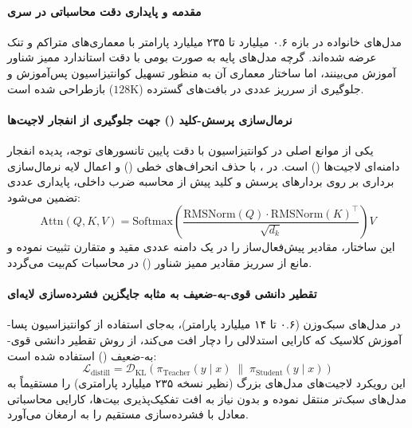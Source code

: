 \item {}

\paragraph*{مقدمه و پایداری دقت محاسباتی در سری }
مدل‌های خانواده  \cite{qwen2025qwen3} در بازه ۰.۶ میلیارد تا ۲۳۵ میلیارد پارامتر با معماری‌های متراکم و تنک عرضه شده‌اند. گرچه مدل‌های پایه به صورت بومی با دقت استاندارد ممیز شناور آموزش می‌بینند، اما ساختار معماری آن به منظور تسهیل کوانتیزاسیون پس‌آموزش و جلوگیری از سرریز عددی در بافت‌های گسترده ($128\text{K}$) بازطراحی شده است.

\paragraph*{نرمال‌سازی پرسش-کلید () جهت جلوگیری از انفجار لاجیت‌ها}
یکی از موانع اصلی در کوانتیزاسیون با دقت پایین تانسورهای توجه، پدیده انفجار دامنه‌ای لاجیت‌ها () است. در ، با حذف انحراف‌های خطی () و اعمال لایه نرمال‌سازی برداری  بر روی بردارهای پرسش و کلید پیش از محاسبه ضرب داخلی، پایداری عددی تضمین می‌شود:
\begin{equation}
    \text{Attn}(Q, K, V) = \text{Softmax}\left( \frac{\text{RMSNorm}(Q) \cdot \text{RMSNorm}(K)^\top}{\sqrt{d_k}} \right) V
\end{equation}
این ساختار، مقادیر پیش‌فعال‌ساز را در یک دامنه عددی مقید و متقارن تثبیت نموده و مانع از سرریز مقادیر ممیز شناور () در محاسبات کم‌بیت می‌گردد.

\paragraph*{تقطیر دانشی قوی-به-ضعیف به مثابه جایگزین فشرده‌سازی لایه‌ای}
در مدل‌های سبک‌وزن (۰.۶ تا ۱۴ میلیارد پارامتر)، به‌جای استفاده از کوانتیزاسیون پسا-آموزش کلاسیک که کارایی استدلالی را دچار افت می‌کند، از روش تقطیر دانشی قوی-به-ضعیف () استفاده شده است:
\begin{equation}
    \mathcal{L}_{\text{distill}} = \mathcal{D}_{\text{KL}}\left( \pi_{\text{Teacher}}(y \mid x) \;\middle\|\; \pi_{\text{Student}}(y \mid x) \right)
\end{equation}
این رویکرد لاجیت‌های مدل‌های بزرگ (نظیر نسخه ۲۳۵ میلیارد پارامتری) را مستقیماً به مدل‌های سبک‌تر منتقل نموده و بدون نیاز به افت تفکیک‌پذیری بیت‌ها، کارایی محاسباتی معادل با فشرده‌سازی مستقیم را به ارمغان می‌آورد.

